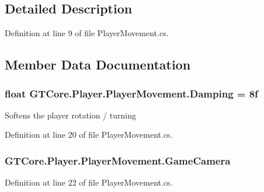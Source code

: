 \subsection{Detailed Description}


Definition at line 9 of file Player\+Movement.\+cs.



\subsection{Member Data Documentation}
\hypertarget{class_g_t_core_1_1_player_1_1_player_movement_a56441c76eefb5daef3c5c975d0a47e82}{}
\subsubsection[{Damping}]{\setlength{\rightskip}{0pt plus 5cm}float G\+T\+Core.\+Player.\+Player\+Movement.\+Damping = 8f}\label{class_g_t_core_1_1_player_1_1_player_movement_a56441c76eefb5daef3c5c975d0a47e82}


Softens the player rotation / turning 



Definition at line 20 of file Player\+Movement.\+cs.

\hypertarget{class_g_t_core_1_1_player_1_1_player_movement_aeaee3024bab44f3ddef8312a2c13a31d}{}
\subsubsection[{Game\+Camera}]{ G\+T\+Core.\+Player.\+Player\+Movement.\+Game\+Camera}\label{class_g_t_core_1_1_player_1_1_player_movement_aeaee3024bab44f3ddef8312a2c13a31d}


Definition at line 22 of file Player\+Movement.\+cs.

\hypertarget{class_g_t_core_1_1_player_1_1_player_movement_acbd313912a6eda65aed7bd5a393ad1d9}{}
